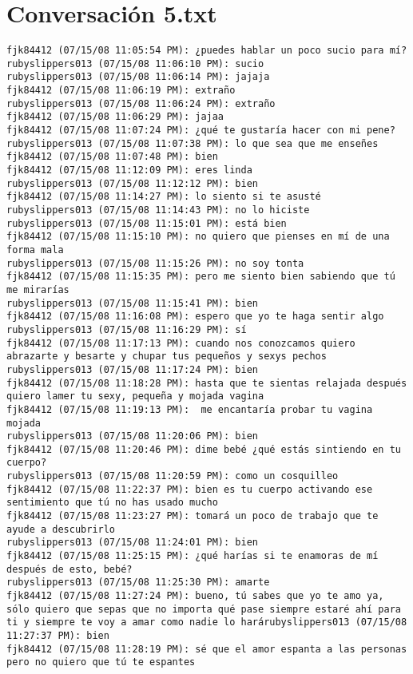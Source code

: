 \section{Conversaci\'on 5.txt}

\begin{verbatim}
fjk84412 (07/15/08 11:05:54 PM): ¿puedes hablar un poco sucio para mí?
rubyslippers013 (07/15/08 11:06:10 PM): sucio
rubyslippers013 (07/15/08 11:06:14 PM): jajaja
fjk84412 (07/15/08 11:06:19 PM): extraño
rubyslippers013 (07/15/08 11:06:24 PM): extraño
fjk84412 (07/15/08 11:06:29 PM): jajaa
fjk84412 (07/15/08 11:07:24 PM): ¿qué te gustaría hacer con mi pene?
rubyslippers013 (07/15/08 11:07:38 PM): lo que sea que me enseñes
fjk84412 (07/15/08 11:07:48 PM): bien
fjk84412 (07/15/08 11:12:09 PM): eres linda
rubyslippers013 (07/15/08 11:12:12 PM): bien 
fjk84412 (07/15/08 11:14:27 PM): lo siento si te asusté
rubyslippers013 (07/15/08 11:14:43 PM): no lo hiciste
rubyslippers013 (07/15/08 11:15:01 PM): está bien
fjk84412 (07/15/08 11:15:10 PM): no quiero que pienses en mí de una forma mala
rubyslippers013 (07/15/08 11:15:26 PM): no soy tonta
fjk84412 (07/15/08 11:15:35 PM): pero me siento bien sabiendo que tú me mirarías
rubyslippers013 (07/15/08 11:15:41 PM): bien
fjk84412 (07/15/08 11:16:08 PM): espero que yo te haga sentir algo
rubyslippers013 (07/15/08 11:16:29 PM): sí
fjk84412 (07/15/08 11:17:13 PM): cuando nos conozcamos quiero abrazarte y besarte y chupar tus pequeños y sexys pechos
rubyslippers013 (07/15/08 11:17:24 PM): bien
fjk84412 (07/15/08 11:18:28 PM): hasta que te sientas relajada después quiero lamer tu sexy, pequeña y mojada vagina 
fjk84412 (07/15/08 11:19:13 PM):  me encantaría probar tu vagina mojada 
rubyslippers013 (07/15/08 11:20:06 PM): bien
fjk84412 (07/15/08 11:20:46 PM): dime bebé ¿qué estás sintiendo en tu cuerpo?
rubyslippers013 (07/15/08 11:20:59 PM): como un cosquilleo
fjk84412 (07/15/08 11:22:37 PM): bien es tu cuerpo activando ese sentimiento que tú no has usado mucho
fjk84412 (07/15/08 11:23:27 PM): tomará un poco de trabajo que te ayude a descubrirlo
rubyslippers013 (07/15/08 11:24:01 PM): bien
fjk84412 (07/15/08 11:25:15 PM): ¿qué harías si te enamoras de mí después de esto, bebé?
rubyslippers013 (07/15/08 11:25:30 PM): amarte
fjk84412 (07/15/08 11:27:24 PM): bueno, tú sabes que yo te amo ya, sólo quiero que sepas que no importa qué pase siempre estaré ahí para ti y siempre te voy a amar como nadie lo harárubyslippers013 (07/15/08 11:27:37 PM): bien
fjk84412 (07/15/08 11:28:19 PM): sé que el amor espanta a las personas pero no quiero que tú te espantes

\end{verbatim}

